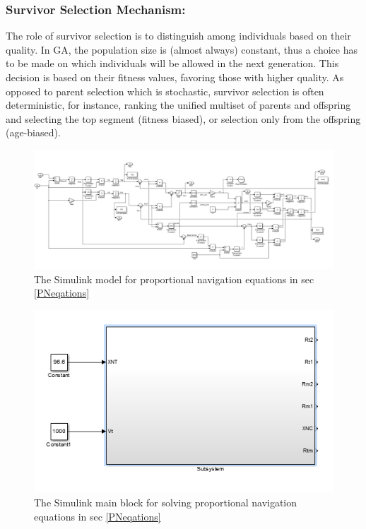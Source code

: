 \subsubsection*{Survivor Selection Mechanism:}
The role of survivor selection is to distinguish among individuals based on their quality. In GA, the population size is (almost always) constant, thus a choice has to be made on which individuals will be allowed in the next generation. This decision is based on their fitness values, favoring those with higher quality.
As opposed to parent selection which is stochastic, survivor selection is often deterministic, for instance, ranking the unified multiset of parents and offspring and selecting the top segment (fitness biased), or selection only from the offspring (age-biased).



\begin{landscape}
	\begin{figure}[H]
		\centering
		\includegraphics[scale = 0.70]{fig/PNeq.PNG}
		\caption{The Simulink model for proportional navigation equations in sec \ref{PNeqations}}
		\label{PN eq}
	\end{figure}
\end{landscape}


\begin{figure}[H]
	\centering
	\includegraphics[scale = 0.75]{fig/PNmainBlock.PNG}
	\caption{The Simulink main block for solving proportional navigation equations in sec \ref{PNeqations}}
	\label{PN main block}
\end{figure}


